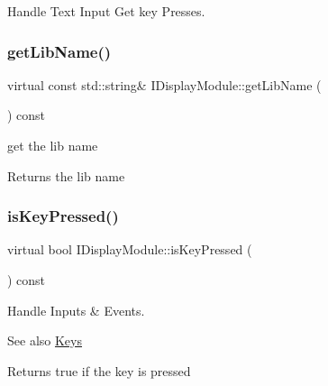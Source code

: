 Handle Text Input Get key Presses. \mbox{\label{class_i_display_module_a9bf79b064eeac8c3e2e5c8e018fef5bb}} 
\subsubsection{\texorpdfstring{get\+Lib\+Name()}{getLibName()}}
{\footnotesize\ttfamily virtual const std\+::string\& I\+Display\+Module\+::get\+Lib\+Name (\begin{DoxyParamCaption}{ }\end{DoxyParamCaption}) const\hspace{0.3cm}{\ttfamily [pure virtual]}}



get the lib name 

\begin{DoxyReturn}{Returns}
the lib name 
\end{DoxyReturn}
\mbox{\label{class_i_display_module_a1fdf2455de8a31974c89d7d2c717a8ef}} 
\subsubsection{\texorpdfstring{is\+Key\+Pressed()}{isKeyPressed()}}
{\footnotesize\ttfamily virtual bool I\+Display\+Module\+::is\+Key\+Pressed (\begin{DoxyParamCaption}\item[{\hyperlink{class_i_display_module_ac77668b52466bcd2dbd8446e5bfe412f}{I\+Display\+Module\+::\+Keys}}]{ }\end{DoxyParamCaption}) const\hspace{0.3cm}{\ttfamily [pure virtual]}}



Handle Inputs \& Events. 

\begin{DoxySeeAlso}{See also}
\hyperlink{class_i_display_module_ac77668b52466bcd2dbd8446e5bfe412f}{Keys} 
\end{DoxySeeAlso}
\begin{DoxyReturn}{Returns}
true if the key is pressed 
\end{DoxyReturn}
\mbox{\label{class_i_display_module_a50c442d1c03f9f989e4500afa8a7294c}} 
